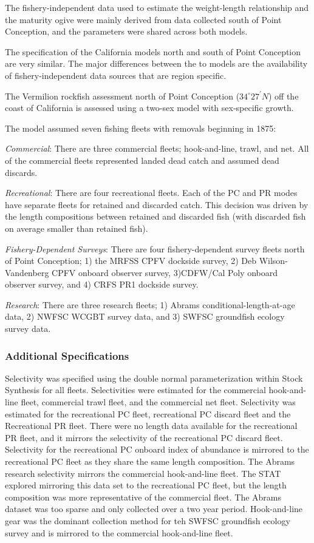 \documentclass[
  english,
  a4paper,
]{article}
\begin{document}
The fishery-independent data used to estimate the weight-length relationship and the maturity ogive were mainly derived from data collected south of Point Conception, and the parameters were shared across both models.

The specification of the California models north and south of Point Conception
are very similar. The major differences between the to models are the availability
of fishery-independent data sources that are region specific.

The Vermilion rockfish assessment north of Point Conception ($34^\circ 27^\prime N$) off the coast of California is assessed using a two-sex model with sex-specific growth.

The model assumed seven fishing fleets with removals beginning in 1875:

\emph{Commercial}: There are three commercial fleets; hook-and-line, trawl, and net.
All of the commercial fleets represented landed dead catch and assumed dead discards.

\emph{Recreational}: There are four recreational fleets. Each of the PC and PR modes have
separate fleets for retained and discarded catch. This decision was driven by the
length compositions between retained
and discarded fish (with discarded fish on average smaller than retained fish).

\emph{Fishery-Dependent Surveys}: There are four fishery-dependent survey fleets north
of Point Conception; 1) the MRFSS CPFV dockside survey, 2) Deb Wilson-Vandenberg CPFV onboard observer survey, 3)CDFW/Cal Poly onboard observer survey, and 4) CRFS PR1 dockside survey.

\emph{Research}: There are three research fleets; 1) Abrams conditional-length-at-age data,
2) NWFSC WCGBT survey data, and 3) SWFSC groundfish ecology survey data.

\hypertarget{additional-specifications}{%
\subsubsection{Additional Specifications}\label{additional-specifications}}

Selectivity was specified using the double normal parameterization within Stock Synthesis for all fleets. Selectivities were estimated for the commercial hook-and-line fleet, commercial trawl fleet, and the commercial net fleet. Selectivity was estimated for the recreational PC fleet, recreational PC discard fleet and the Recreational PR fleet. There were no length data available for the recreational PR fleet, and it mirrors the selectivity of the recreational PC discard fleet.
Selectivity for the recreational PC onboard index of abundance is mirrored to the recreational
PC fleet as they share the same length composition. The Abrams research selectivity mirrors the
commercial hook-and-line fleet. The STAT explored mirroring this data set to the recreational PC fleet, but the length composition was more representative of the commercial fleet. The Abrams dataset was too sparse and only collected over a two year period. Hook-and-line gear was the
dominant collection method for teh SWFSC groundfish ecology survey and is mirrored to the commercial hook-and-line fleet.
\end{document}
